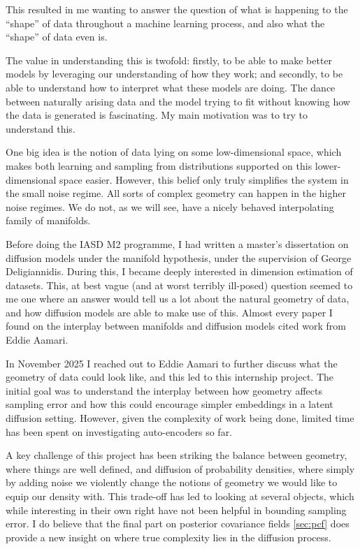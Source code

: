\documentclass{article}
\theoremstyle{plain}
\theoremstyle{definition}
\theoremstyle{remark}
\begin{document}
This resulted in me wanting to answer the question of what is happening to the ``shape'' of data throughout a machine learning process, and also what the ``shape'' of data even is.

The value in understanding this is twofold: firstly, to be able to make better models by leveraging our understanding of how they work; and secondly, to be able to understand how to interpret what these models are doing. The dance between naturally arising data and the model trying to fit without knowing how the data is generated is fascinating. My main motivation was to try to understand this. 

One big idea is the notion of data lying on some low-dimensional space, which makes both learning and sampling from distributions supported on this lower-dimensional space easier. However, this belief only truly simplifies the system in the small noise regime. All sorts of complex geometry can happen in the higher noise regimes. We do not, as we will see, have a nicely behaved interpolating family of manifolds.

Before doing the IASD M2 programme, I had written a master's dissertation on diffusion models under the manifold hypothesis, under the supervision of George Deligiannidis. During this, I became deeply interested in dimension estimation of datasets. This, at best vague (and at worst terribly ill-posed) question seemed to me one where an answer would tell us a lot about the natural geometry of data, and how diffusion models are able to make use of this. Almost every paper I found on the interplay between manifolds and diffusion models cited work from Eddie Aamari.

In November 2025 I reached out to Eddie Aamari to further discuss what the geometry of data could look like, and this led to this internship project. The initial goal was to understand the interplay between how geometry affects sampling error and how this could encourage simpler embeddings in a latent diffusion setting. However, given the complexity of work being done, limited time has been spent on investigating auto-encoders so far.

A key challenge of this project has been striking the balance between geometry, where things are well defined, and diffusion of probability densities, where simply by adding noise we violently change the notions of geometry we would like to equip our density with. This trade-off has led to looking at several objects, which while interesting in their own right have not been helpful in bounding sampling error. I do believe that the final part on posterior covariance fields \autoref{sec:pcf} does provide a new insight on where true complexity lies in the diffusion process.
\end{document}
